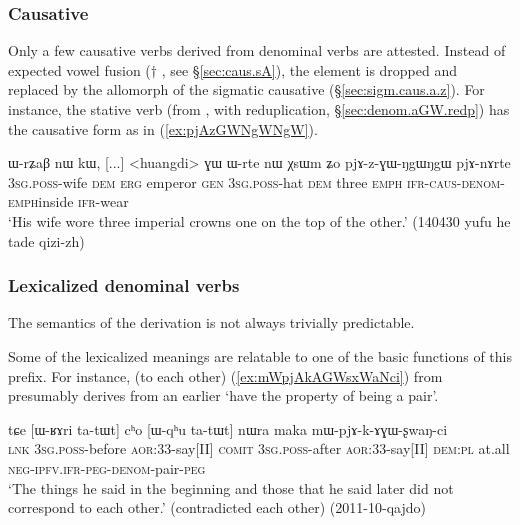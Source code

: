 \subsubsection{Causative}  \label{sec:denom.aGW.caus}
Only a few causative verbs derived from  denominal verbs are attested. Instead of expected vowel fusion ($\dagger$ \fl{} , see §\ref{sec:caus.sA}), the  element is dropped and replaced by the  allomorph of the sigmatic causative (§\ref{sec:sigm.caus.a.z}). For instance, the stative verb  (from , with reduplication, §\ref{sec:denom.aGW.redp}) has the causative form   as in (\ref{ex:pjAzGWNgWNgW}).

\begin{exe}
\ex \label{ex:pjAzGWNgWNgW}
\gll ɯ-rʑaβ nɯ kɯ, [...] <huangdi> ɣɯ ɯ-rte nɯ χsɯm ʑo pjɤ-z-ɣɯ-ŋgɯ\redp{}ŋgɯ pjɤ-nɤrte  \\
\textsc{3sg}.\textsc{poss}-wife \textsc{dem} \textsc{erg} { } emperor \textsc{gen} \textsc{3sg}.\textsc{poss}-hat \textsc{dem} three \textsc{emph} \textsc{ifr}-\textsc{caus}-\textsc{denom}-\textsc{emph}\redp{}inside \textsc{ifr}-wear \\
\glt `His wife wore three imperial crowns one on the top of the other.' (140430 yufu he tade qizi-zh)
 \end{exe}
 
 \subsubsection{Lexicalized denominal verbs}  \label{sec:denom.aGW.lexicalized}
The semantics of the  derivation is not always trivially predictable.

Some of the lexicalized meanings are relatable to one of the basic functions of this prefix. For instance,  (to each other) (\ref{ex:mWpjAkAGWsxWaNci}) from  presumably derives from an earlier `have the property of being a pair'.

\begin{exe}
\ex \label{ex:mWpjAkAGWsxWaNci}
\gll tɕe [ɯ-ʁɤri ta-tɯt] cʰo [ɯ-qʰu ta-tɯt] nɯra maka mɯ-pjɤ-k-ɤɣɯ-ʂwaŋ-ci \\
\textsc{lnk} \textsc{3sg}.\textsc{poss}-before \textsc{aor}:3\fl{}3-say[II] \textsc{comit} \textsc{3sg}.\textsc{poss}-after  \textsc{aor}:3\fl{}3-say[II] \textsc{dem}:\textsc{pl} at.all \textsc{neg}-\textsc{ipfv}.\textsc{ifr}-\textsc{peg}-\textsc{denom}-pair-\textsc{peg} \\
\glt `The things he said in the beginning and those that he said later did not correspond to each other.' (contradicted each other) (2011-10-qajdo)
\end{exe}


